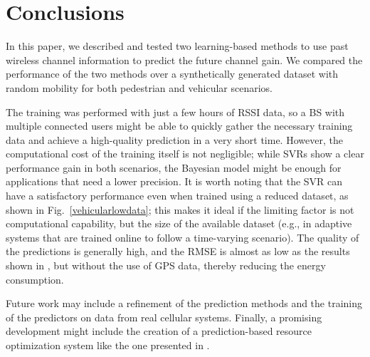 \documentclass[conference, a4paper]{IEEEtran}
\begin{document}
\section{Conclusions}

In this paper, we described and tested two learning-based methods to use past wireless channel information to predict the future channel gain. We compared the performance of the two methods over a synthetically generated dataset with random mobility for both pedestrian and vehicular scenarios.

The training was performed with just a few hours of RSSI data, so a BS with multiple connected users might be able to quickly gather the necessary training data and achieve a high-quality prediction in a very short time. However, the computational cost of the training itself is not negligible; while SVRs show a clear performance gain in both scenarios, the Bayesian model might be enough for applications that need a lower precision. It is worth noting that the SVR can have a satisfactory performance even when trained using a reduced dataset, as shown in Fig.~\ref{vehicularlowdata}; this makes it ideal if the limiting factor is not computational capability, but the size of the available dataset (e.g., in adaptive systems that are trained online to follow a time-varying scenario).
The quality of the predictions is generally high, and the RMSE is almost as low as the results shown in \cite{liao2015channel}, but without the use of GPS data, thereby reducing the energy consumption.

Future work may include a refinement of the prediction methods and the training of the predictors on data from real cellular systems.
Finally, a promising development might include the creation of a prediction-based resource optimization system like the one presented in \cite{mekki2015anticipatory}.

%
%
\end{document}
